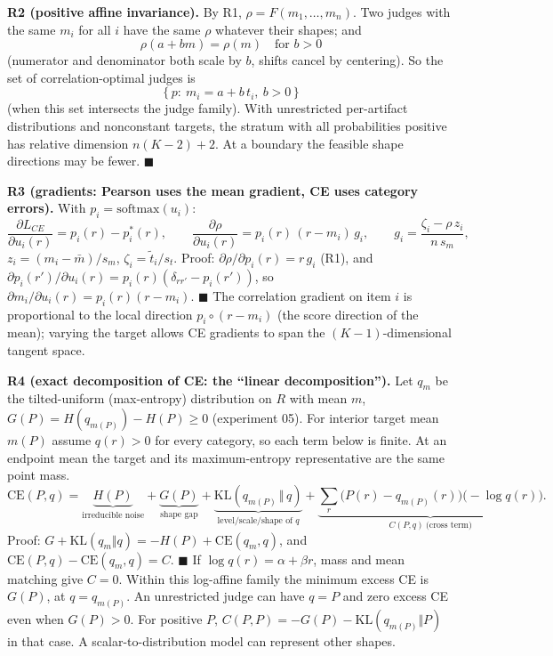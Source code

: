 \documentclass[11pt]{article}
\newcommand{\ttil}{\tilde t}
\begin{document}
\textbf{R2 (positive affine invariance).} By R1, $\rho=F(m_1,\dots,m_n)$. Two judges with the same $m_i$ for all $i$ have the same $\rho$ whatever their shapes; and
\[
\rho(a+bm)=\rho(m)\quad\text{for } b>0
\]
(numerator and denominator both scale by $b$, shifts cancel by centering). So the set of correlation-optimal judges is
\[
\{\,p:\ m_i=a+b\,t_i,\ b>0\,\}
\]
(when this set intersects the judge family). With unrestricted per-artifact distributions and nonconstant targets, the stratum with all probabilities positive has relative dimension $n(K-2)+2$. At a boundary the feasible shape directions may be fewer. \hfill$\blacksquare$

\textbf{R3 (gradients: Pearson uses the mean gradient, CE uses category errors).} With $p_i=\mathrm{softmax}(u_i)$:
\[
\frac{\partial L_{CE}}{\partial u_i(r)}=p_i(r)-p^\ast_i(r),\qquad
\frac{\partial\rho}{\partial u_i(r)}=p_i(r)\,(r-m_i)\,g_i,\qquad g_i=\frac{\zeta_i-\rho\,z_i}{n\,s_m},
\]
$z_i=(m_i-\bar m)/s_m$, $\zeta_i=\ttil_i/s_t$. Proof: $\partial\rho/\partial p_i(r)=r\,g_i$ (R1), and $\partial p_i(r')/\partial u_i(r)=p_i(r)(\delta_{rr'}-p_i(r'))$, so $\partial m_i/\partial u_i(r)=p_i(r)(r-m_i)$. \hfill$\blacksquare$ The correlation gradient on item $i$ is proportional to the local direction $p_i\circ(r-m_i)$ (the score direction of the mean); varying the target allows CE gradients to span the $(K-1)$-dimensional tangent space.

\textbf{R4 (exact decomposition of CE: the ``linear decomposition'').} Let $q_m$ be the tilted-uniform (max-entropy) distribution on $R$ with mean $m$, $G(P)=H(q_{m(P)})-H(P)\ge0$ (experiment 05). For interior target mean $m(P)$ assume $q(r)>0$ for every category, so each term below is finite. At an endpoint mean the target and its maximum-entropy representative are the same point mass.
\[
\mathrm{CE}(P,q)=\underbrace{H(P)}_{\text{irreducible noise}}+\underbrace{G(P)}_{\text{shape gap}}+\underbrace{\mathrm{KL}(q_{m(P)}\,\Vert\,q)}_{\text{level/scale/shape of }q}+\underbrace{\sum_r\big(P(r)-q_{m(P)}(r)\big)\big(-\log q(r)\big)}_{C(P,q)\ \text{(cross term)}}.
\]
Proof: $G+\mathrm{KL}(q_m\Vert q)=-H(P)+\mathrm{CE}(q_m,q)$, and $\mathrm{CE}(P,q)-\mathrm{CE}(q_m,q)=C$. \hfill$\blacksquare$ If $\log q(r)=\alpha+\beta r$, mass and mean matching give $C=0$. Within this log-affine family the minimum excess CE is $G(P)$, at $q=q_{m(P)}$. An unrestricted judge can have $q=P$ and zero excess CE even when $G(P)>0$. For positive $P$, $C(P,P)=-G(P)-\mathrm{KL}(q_{m(P)}\Vert P)$ in that case. A scalar-to-distribution model can represent other shapes.
\end{document}
